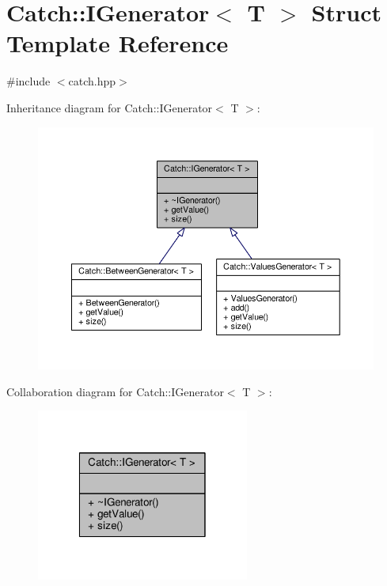 \hypertarget{struct_catch_1_1_i_generator}{\section{Catch\-:\-:I\-Generator$<$ T $>$ Struct Template Reference}
\label{struct_catch_1_1_i_generator}
}


{\ttfamily \#include $<$catch.\-hpp$>$}



Inheritance diagram for Catch\-:\-:I\-Generator$<$ T $>$\-:
\nopagebreak
\begin{figure}[H]
\begin{center}
\leavevmode
\includegraphics[width=350pt]{struct_catch_1_1_i_generator__inherit__graph}
\end{center}
\end{figure}


Collaboration diagram for Catch\-:\-:I\-Generator$<$ T $>$\-:
\nopagebreak
\begin{figure}[H]
\begin{center}
\leavevmode
\includegraphics[width=198pt]{struct_catch_1_1_i_generator__coll__graph}
\end{center}
\end{figure}
